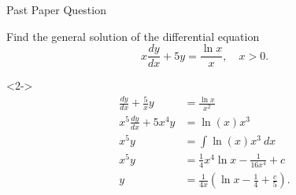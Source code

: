 \documentclass[8pt]{beamer}
\begin{document}
\begin{frame}{Past Paper Question}
	\begin{problem}
		Find the general solution of the differential equation
		\[
		x \frac{dy}{dx} + 5y = \frac{\ln x}{x}, \quad x > 0
		.\] 
	\end{problem}

	\begin{solution}<2->
		\begin{align*}
			\frac{dy}{dx} + \frac{5}{x} y &= \frac{\ln x}{x^2} \\
			x^5 \frac{dy}{dx}+ 5x^4 y &= \ln (x) x^3 \\
			x^5y &=  \int \ln (x) x^3 \ dx \\
			x^5y &= \frac{1}{4}x^4 \ln x - \frac{1}{16x^4}+c\\
			y &= \frac{1}{4x}(\ln x - \frac{1}{4}+\frac{c}{5})
		.\end{align*}
	\end{solution}
\end{frame}
\end{document}
